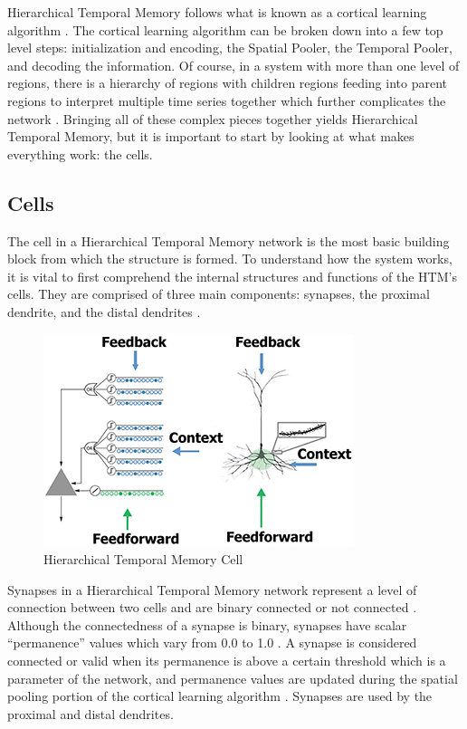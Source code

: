 \documentclass[fleqn,minimal]{article}
\begin{document}
	Hierarchical Temporal Memory follows what is known as a cortical learning algorithm \cite{Principles}. The cortical learning algorithm can be broken down into a few top level steps: initialization and encoding, the Spatial Pooler, the Temporal Pooler, and decoding the information. Of course, in a system with more than one level of regions, there is a hierarchy of regions with children regions feeding into parent regions to interpret multiple time series together which further complicates the network \cite{Dillon}. Bringing all of these complex pieces together yields Hierarchical Temporal Memory, but it is important to start by looking at what makes everything work: the cells.
	
	\subsection{Cells}
	
	The cell in a Hierarchical Temporal Memory network is the most basic building block from which the structure is formed. To understand how the system works, it is vital to first comprehend the internal structures and functions of the HTM's cells. They are comprised of three main components: synapses, the proximal dendrite, and the distal dendrites \cite{Whitepaper}.
	
	\begin{figure}[h!]
		\centering
		\includegraphics[width=\linewidth]{images/HTMCell.jpg}
		\caption{Hierarchical Temporal Memory Cell}
		\label{fig 1}
	\end{figure}
	
	Synapses in a Hierarchical Temporal Memory network represent a level of connection between two cells and are binary connected or not connected \cite{Whitepaper}. Although the connectedness of a synapse is binary, synapses have scalar ``permanence'' values which vary from 0.0 to 1.0 \cite{Principles}. A synapse is considered connected or valid when its permanence is above a certain threshold which is a parameter of the network, and permanence values are updated during the spatial pooling portion of the cortical learning algorithm \cite{Whitepaper}. Synapses are used by the proximal and distal dendrites.
	
\end{document}
